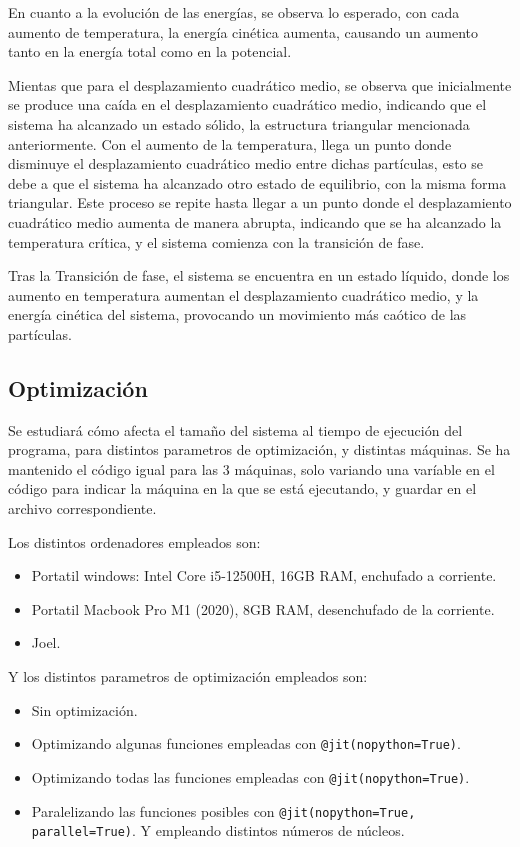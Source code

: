 \documentclass[11pt, twoside]{article} %
\begin{document}
En cuanto a la evolución de las energías, se observa lo esperado, con cada aumento de 
temperatura, la energía cinética aumenta, causando un aumento tanto en la energía
total como en la potencial.

\newpage

Mientas que para el desplazamiento cuadrático medio, se observa que inicialmente se 
produce una caída en el desplazamiento cuadrático medio, indicando que el sistema ha
alcanzado un estado sólido, la estructura triangular mencionada anteriormente. Con el 
aumento de la temperatura, llega un punto donde disminuye el desplazamiento cuadrático
medio entre dichas partículas, esto se debe a que el sistema ha alcanzado otro estado
de equilibrio, con la misma forma triangular. Este proceso se repite hasta llegar a un
punto donde el desplazamiento cuadrático medio aumenta de manera abrupta, indicando que
se ha alcanzado la temperatura crítica, y el sistema comienza con la transición de fase.

Tras la Transición de fase, el sistema se encuentra en un estado líquido, donde los 
aumento en temperatura aumentan el desplazamiento cuadrático medio, y la energía cinética
del sistema, provocando un movimiento más caótico de las partículas.

\newpage

\subsection{Optimización}

Se estudiará cómo afecta el tamaño del sistema al tiempo de ejecución del programa, 
para distintos parametros de optimización, y distintas máquinas. Se ha mantenido el 
código igual para las 3 máquinas, solo variando una varíable en el código para
indicar la máquina en la que se está ejecutando, y guardar en el archivo correspondiente.

Los distintos ordenadores empleados son:
\begin{itemize}
    \item Portatil windows: Intel Core i5-12500H, 16GB RAM, enchufado a corriente.
    \item Portatil Macbook Pro M1 (2020), 8GB RAM, desenchufado de la corriente.
    \item Joel.
\end{itemize}
Y los distintos parametros de optimización empleados son:
\begin{itemize}
    \item Sin optimización.
    \item Optimizando algunas funciones empleadas con \texttt{@jit(nopython=True)}.
    \item Optimizando todas las funciones empleadas con \texttt{@jit(nopython=True)}.
    \item Paralelizando las funciones posibles con \texttt{@jit(nopython=True, parallel=True)}.
    Y empleando distintos números de núcleos.
\end{itemize}
\end{document}

